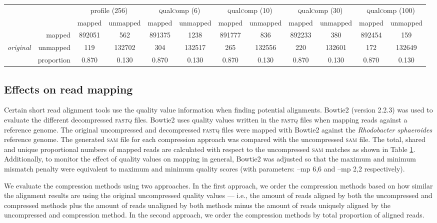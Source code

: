 \documentclass{bioinfo}
\begin{document}
\begin{table}[!tbhp]
\begin{small}
\begin{tabular}{lr|cc|cc|cc|cc|cc}
&  & \multicolumn{2}{c|}{profile (256)} & \multicolumn{2}{c|}{\textsc{q}ual\textsc{c}omp (6)} & \multicolumn{2}{c|}{\textsc{q}ual\textsc{c}omp (10)} & \multicolumn{2}{c|}{\textsc{q}ual\textsc{c}omp (30)} & \multicolumn{2}{c}{\textsc{q}ual\textsc{c}omp (100)} \\
& &  mapped & unmapped & mapped & unmapped & mapped & unmapped & mapped & unmapped & mapped & unmapped \\ 
\cline{2-12}
& mapped & 892051 & 562 & 891375 & 1238 & 891777 & 836 & 892233 & 380 & 892454 & 159 \\ 
{\em original}  & unmapped & 119 & 132702 & 304 & 132517 & 265 & 132556 & 220 & 132601 & 172 & 132649 \\ 
\cline{2-12}
& proportion & 0.870 & 0.130 & 0.870 & 0.130 & 0.870 & 0.130 & 0.870 & 0.130 & 0.870 & 0.130 \\
\end{tabular}
\end{small}

\label{tab:aligner}
\end{table}


\subsection{Effects on read mapping}

Certain short read alignment tools use the quality value information
when finding potential alignments. Bowtie2 (version 2.2.3) was used to
evaluate the different decompressed \textsc{fastq} files. Bowtie2 uses
quality values written in the \textsc{fastq} files when mapping reads
against a reference genome. The original uncompressed and decompressed
\textsc{fastq} files were mapped with Bowtie2 against the
\textit{Rhodobacter sphaeroides} reference genome. The generated
\textsc{sam} file for each compression approach was compared with the
uncompressed \textsc{sam} file. The total, shared and unique
proportional numbers of mapped reads are calculated with respect to
the uncompressed \textsc{sam} matches as shown in Table
\ref{tab:aligner}. Additionally, to monitor the effect of quality
values on mapping in general, Bowtie2 was adjusted so that the maximum
and minimum mismatch penalty were equivalent to maximum and minimum
quality scores (with parameters: --mp 6,6 and --mp 2,2 respectively).

We evaluate the compression methods using two approaches. In the first
approach, we order the compression methods based on how similar the
alignment results are using the original uncompressed quality values
--- i.e., the amount of reads aligned by both the uncompressed and
compressed methods plus the amount of reads unaligned by both methods
minus the amount of reads uniquely aligned by the uncompressed and
compression method. In the second approach, we order the compression
methods by total proportion of aligned reads.
\end{document}
